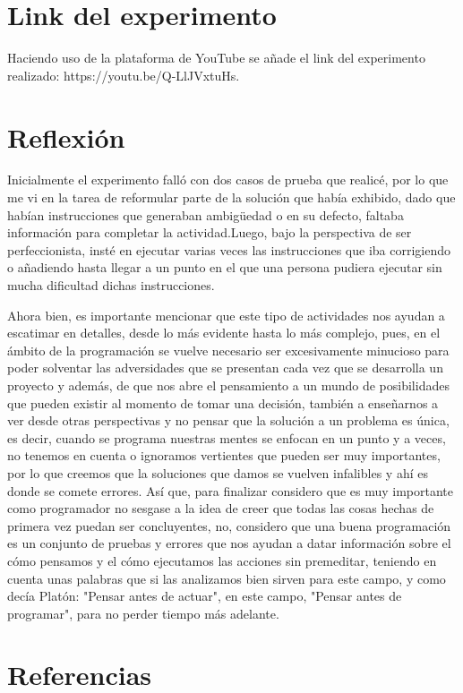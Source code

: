\documentclass{article}
\begin{document}
\section{Link del experimento}
Haciendo uso de la plataforma de YouTube se añade el link del experimento realizado: https://youtu.be/Q-LlJVxtuHs.



\newpage
\section{Reflexión}
Inicialmente el experimento falló con dos casos de prueba que realicé, por lo que me vi en la tarea de reformular parte de la solución que había exhibido, dado que habían instrucciones que generaban ambigüedad o en su defecto, faltaba información para completar la actividad.Luego, bajo la perspectiva de ser perfeccionista, insté en ejecutar varias veces las instrucciones que iba corrigiendo o añadiendo hasta llegar a un punto en el que una persona pudiera ejecutar sin mucha dificultad dichas instrucciones.

Ahora bien, es importante mencionar que este tipo de actividades nos ayudan a escatimar en detalles, desde lo más evidente hasta lo más complejo, pues, en el ámbito de la programación se vuelve necesario ser excesivamente minucioso para poder solventar las adversidades que se presentan cada vez que se desarrolla un proyecto y además, de que nos abre el pensamiento a un mundo de posibilidades que pueden existir al momento de tomar una decisión, también a enseñarnos a ver desde otras perspectivas y no pensar que la solución a un problema es única, es decir, cuando se programa nuestras mentes se enfocan en un punto y a veces, no tenemos en cuenta o ignoramos vertientes que pueden ser muy importantes, por lo que creemos que la soluciones que damos se vuelven infalibles y ahí es donde se comete errores. Así que, para finalizar considero que es muy importante como programador no sesgase a la idea de creer que todas las cosas hechas de primera vez puedan ser concluyentes, no, considero que una buena programación es un conjunto de pruebas y errores que nos ayudan a datar información sobre el cómo pensamos y el cómo ejecutamos las acciones sin premeditar, teniendo en cuenta unas palabras que si las analizamos bien sirven para este campo, y como decía Platón: "Pensar antes de actuar", en este campo, "Pensar antes de programar", para no perder tiempo más adelante.

\newpage
\section{Referencias}


\cite{calistenia}
\end{document}
